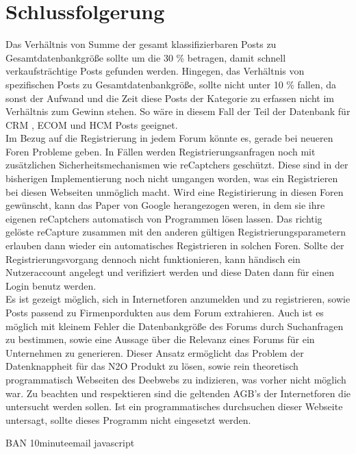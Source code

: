 \section{Schlussfolgerung}
Das Verhältnis von Summe der gesamt klassifizierbaren Posts zu Gesamtdatenbankgröße sollte um die 30 \% betragen, damit schnell verkaufsträchtige Posts gefunden werden. Hingegen, das Verhältnis von spezifischen Posts zu Gesamtdatenbankgröße, sollte nicht unter 10 \% fallen, da sonst der Aufwand und die Zeit diese Posts der Kategorie zu erfassen nicht im Verhältnis zum Gewinn stehen. So wäre in diesem Fall der Teil der Datenbank für CRM , ECOM und HCM Posts geeignet.\\
Im Bezug auf die Registrierung in jedem Forum könnte es, gerade bei neueren Foren Probleme geben. In Fällen werden Registrierungsanfragen noch mit zusätzlichen Sicherheitsmechanismen wie reCaptchers geschützt. Diese sind in der bisherigen Implementierung noch nicht umgangen worden, was ein Registrieren bei diesen Webseiten unmöglich macht. Wird eine Registirierung in diesen Foren gewünscht, kann das Paper von Google herangezogen weren, in dem sie ihre eigenen reCaptchers automatisch von Programmen lösen lassen. Das richtig gelöste reCapture zusammen mit den anderen gültigen Registrierungsparametern erlauben dann wieder ein automatisches Registrieren in solchen Foren. Sollte der Registrierungsvorgang dennoch nicht funktionieren, kann händisch ein Nutzeraccount angelegt und verifiziert werden und diese Daten dann für einen Login benutz werden.\\
Es ist gezeigt möglich, sich in Internetforen anzumelden und zu registrieren, sowie Posts passend zu Firmenpordukten aus dem Forum extrahieren.
Auch ist es möglich mit kleinem Fehler die Datenbankgröße des Forums durch Suchanfragen zu bestimmen, sowie eine Aussage über die Relevanz eines Forums für ein Unternehmen zu generieren. Dieser Ansatz ermöglicht das Problem der Datenknappheit für das N2O Produkt zu lösen, sowie rein theoretisch programmatisch Webseiten des Deebwebs zu indizieren, was vorher nicht möglich war. Zu beachten und respektieren sind die geltenden AGB's der Internetforen die untersucht werden sollen. Ist ein programmatisches durchsuchen dieser Webseite untersagt, sollte dieses Programm nicht eingesetzt werden.

BAN 10minuteemail
javascript